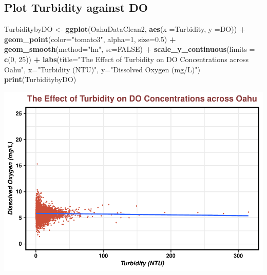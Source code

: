 \documentclass[12pt,]{article}
\newenvironment{Shaded}{\begin{snugshade}}{\end{snugshade}}
\newcommand{\KeywordTok}[1]{\textcolor[rgb]{0.13,0.29,0.53}{\textbf{#1}}}
\newcommand{\DataTypeTok}[1]{\textcolor[rgb]{0.13,0.29,0.53}{#1}}
\newcommand{\DecValTok}[1]{\textcolor[rgb]{0.00,0.00,0.81}{#1}}
\newcommand{\FloatTok}[1]{\textcolor[rgb]{0.00,0.00,0.81}{#1}}
\newcommand{\StringTok}[1]{\textcolor[rgb]{0.31,0.60,0.02}{#1}}
\newcommand{\OtherTok}[1]{\textcolor[rgb]{0.56,0.35,0.01}{#1}}
\newcommand{\OperatorTok}[1]{\textcolor[rgb]{0.81,0.36,0.00}{\textbf{#1}}}
\newcommand{\NormalTok}[1]{#1}
\begin{document}
\subsection{Plot Turbidity against DO}\label{plot-turbidity-against-do}

\begin{Shaded}
\begin{Highlighting}[]
\NormalTok{TurbiditybyDO <-}\StringTok{ }
\StringTok{  }\KeywordTok{ggplot}\NormalTok{(OahuDataClean2, }\KeywordTok{aes}\NormalTok{(}\DataTypeTok{x =}\NormalTok{Turbidity, }\DataTypeTok{y =}\NormalTok{DO)) }\OperatorTok{+}
\StringTok{  }\KeywordTok{geom_point}\NormalTok{(}\DataTypeTok{color=}\StringTok{"tomato3"}\NormalTok{, }\DataTypeTok{alpha=}\DecValTok{1}\NormalTok{, }\DataTypeTok{size=}\FloatTok{0.5}\NormalTok{) }\OperatorTok{+}
\StringTok{  }\KeywordTok{geom_smooth}\NormalTok{(}\DataTypeTok{method=}\StringTok{"lm"}\NormalTok{, }\DataTypeTok{se=}\OtherTok{FALSE}\NormalTok{) }\OperatorTok{+}
\StringTok{   }\KeywordTok{scale_y_continuous}\NormalTok{(}\DataTypeTok{limits =} \KeywordTok{c}\NormalTok{(}\DecValTok{0}\NormalTok{, }\DecValTok{25}\NormalTok{)) }\OperatorTok{+}
\StringTok{  }
\StringTok{  }\KeywordTok{labs}\NormalTok{(}\DataTypeTok{title=}\StringTok{"The Effect of Turbidity on DO Concentrations across Oahu"}\NormalTok{, }\DataTypeTok{x=}\StringTok{"Turbidity (NTU)"}\NormalTok{, }\DataTypeTok{y=}\StringTok{"Dissolved Oxygen (mg/L)"}\NormalTok{)}
\KeywordTok{print}\NormalTok{(TurbiditybyDO) }
\end{Highlighting}
\end{Shaded}

\includegraphics{Garcia_ENV872_Project_files/figure-latex/unnamed-chunk-44-1.pdf}
\end{document}
